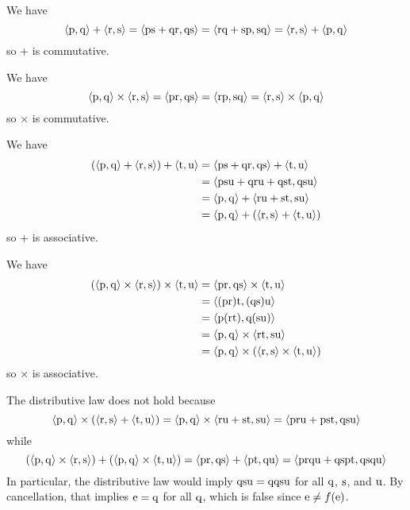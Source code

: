 \begin{solution}
We have
\[\aprn{\mrm p, \mrm q} + \aprn{\mrm r,\mrm s}=\aprn{\mrm{ps+qr}, \mrm{qs}}
=\aprn{\mrm{rq+sp}, \mrm{sq}}=\aprn{\mrm r, \mrm s} + \aprn{\mrm p,\mrm q}\]
so $+$ is commutative.

We have
\[\aprn{\mrm p, \mrm q} \times \aprn{\mrm r,\mrm s}=\aprn{\mrm{pr}, \mrm{qs}}
=\aprn{\mrm{rp}, \mrm{sq}}=\aprn{\mrm r, \mrm s} \times \aprn{\mrm p,\mrm q}\]
so $\times$ is commutative.

We have
\begin{align*}
(\aprn{\mrm p, \mrm q} + \aprn{\mrm r,\mrm s})+ \aprn{\mrm t,\mrm u}
&=\aprn{\mrm{ps}+\mrm{qr}, \mrm{qs}} + \aprn{\mrm t,\mrm u}\\
&=\aprn{\mrm{psu}+\mrm{qru}+\mrm{qst}, \mrm{qsu}}\\
&=\aprn{\mrm{p}, \mrm q} + \aprn{\mrm{ru}+\mrm{st},\mrm{su}}\\
&=\aprn{\mrm p, \mrm q} + (\aprn{\mrm r,\mrm s}+ \aprn{\mrm t,\mrm u})
\end{align*}
so $+$ is associative.

We have
\begin{align*}
(\aprn{\mrm p, \mrm q} \times \aprn{\mrm r,\mrm s})\times \aprn{\mrm t,\mrm u}
&=\aprn{\mrm{pr}, \mrm{qs}}\times \aprn{\mrm t,\mrm u}\\
&=\aprn{(\mrm{pr})\mrm t, (\mrm{qs})\mrm u}\\
&=\aprn{\mrm{p}(\mrm{rt}), \mrm q(\mrm{su})}\\
&=\aprn{\mrm{p}, \mrm q} \times \aprn{\mrm{rt},\mrm{su}}\\
&=\aprn{\mrm p, \mrm q} \times (\aprn{\mrm r,\mrm s}\times \aprn{\mrm t,\mrm u})
\end{align*}
so $\times$ is associative.

The distributive law does not hold because
\[\aprn{\mrm p, \mrm q}\times (\aprn{\mrm r,\mrm s} + \aprn{\mrm t,\mrm u})
= \aprn{\mrm p, \mrm q}\times \aprn{\mrm{ru}+\mrm{st},\mrm{su}}
= \aprn{\mrm{pru}+\mrm{pst},\mrm{qsu}}\]
while
\[(\aprn{\mrm p, \mrm q} \times \aprn{\mrm r,\mrm s}) + (\aprn{\mrm p, \mrm q} \times \aprn{\mrm t,\mrm u})
= \aprn{\mrm{pr}, \mrm{qs}} + \aprn{\mrm{pt}, \mrm{qu}}
= \aprn{\mrm{prqu} + \mrm{qspt}, \mrm{qsqu}}
\]
In particular, the distributive law would imply $\mrm{qsu} = \mrm{qqsu}$ for all $\mrm q$, $\mrm s$, and $\mrm u$.
By cancellation, that implies $\mrm e=\mrm q$ for all $\mrm q$, which is false since $\mrm e\neq f(\mrm e)$.


\end{solution}
